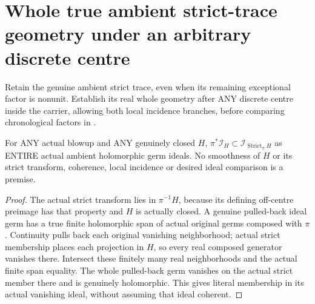 \section{Whole true ambient strict-trace geometry under an arbitrary discrete centre}

Retain the genuine ambient strict trace, even when its remaining
exceptional factor is nonunit. Establish its real whole geometry after
ANY discrete centre inside the carrier, allowing both local incidence
branches, before comparing chronological factors in
\cite[Remark~12.6 and pp.~293--295]{bierstone-milman97-invent-math}.

\begin{lemma}
\label{hir:sharp-actual-pulledback-member-ideal-le-true-strict-member}
\leanok
For ANY actual blowup and ANY genuinely closed $H$,
$\pi^*\mathcal I_H\subset\mathcal I_{\operatorname{Strict}_\pi H}$ as
ENTIRE actual ambient holomorphic germ ideals. No smoothness of $H$ or
its strict transform, coherence, local incidence or desired ideal
comparison is a premise.
\end{lemma}
\begin{proof}
The actual strict transform lies in $\pi^{-1}H$, because its defining
off-centre preimage has that property and $H$ is actually closed.
A genuine pulled-back ideal germ has a true finite holomorphic span of
actual original germs composed with $\pi$. Continuity pulls back each
original vanishing neighborhood; actual strict membership places each
projection in $H$, so every real composed generator vanishes there.
Intersect these finitely many real neighborhoods and the actual finite
span equality. The whole pulled-back germ vanishes on the actual strict
member there and is genuinely holomorphic. This gives literal membership
in its actual vanishing ideal, without assuming that ideal coherent.
\end{proof}

